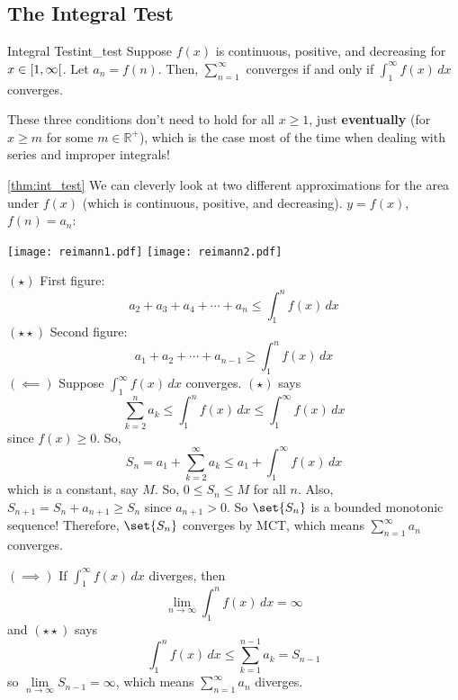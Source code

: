\subsection*{The Integral Test}
\begin{Theorem}{Integral Test}{int_test}
    Suppose $ f(x) $ is continuous, positive, and decreasing
    for $ x\in\interval[open right]{1}{\infty} $. Let $ a_n=f(n) $. Then,
    $ \sum\limits_{n=1}^{\infty}  $ converges if and only if $ \int_{1}^{\infty} f(x)\, d{x} $
    converges.
\end{Theorem}
\begin{Remark}{}{}
    These three conditions don't need to hold for all $ x\geqslant 1 $, just
    \textbf{eventually} (for $ x\geqslant m $ for some $ m\in\mathbb{R}^+ $),
    which is the case most of the time when dealing with series and improper integrals!
\end{Remark}
\begin{Proof}{\ref{thm:int_test}}{}
    We can cleverly look at two different approximations for the area
    under $ f(x) $ (which is continuous, positive, and decreasing).  $ y=f(x) $,
    $ f(n)=a_n $:
    \begin{center}
        \texttt{[image: reimann1.pdf]}
        \texttt{[image: reimann2.pdf]}
    \end{center}
    $ (\star) $ First figure:
    \[ a_2+a_3+a_4+\cdots+a_n\leqslant \int_{1}^{n} f(x)\, d{x} \]
    $ (\star\star) $ Second figure:
    \[ a_1+a_2+\cdots+a_{n-1}\geqslant \int_{1}^{n} f(x)\, d{x} \]
    $ (\impliedby) $ Suppose $ \int_{1}^{\infty} f(x)\, d{x} $ converges. $ (\star) $
    says
    \[ \sum\limits_{k=2}^{n} a_k\leqslant \int_{1}^{n} f(x)\, d{x}\leqslant
        \int_{1}^{\infty} f(x)\, d{x}  \]
    since $ f(x)\geqslant 0 $. So,
    \[ S_n=a_1+\sum\limits_{k=2}^{\infty} a_k\leqslant a_1+\int_{1}^{\infty} f(x)\, d{x}  \]
    which is a constant, say $ M $. So, $ 0\leqslant S_n\leqslant M $ for all $ n $.
    Also, $ S_{n+1}=S_{n}+a_{n+1}\geqslant S_n $ since $ a_{n+1}>0 $. So
    $ \set{S_n} $ is a bounded monotonic sequence! Therefore,
    $ \set{S_n} $ converges by MCT, which means $ \sum\limits_{n=1}^{\infty} a_n $
    converges.

    $ (\implies) $ If $ \int_{1}^{\infty} f(x)\, d{x}  $ diverges, then
    \[ \lim\limits_{{n} \to {\infty}} \int_{1}^{n} f(x)\, d{x} =\infty \]
    and $ (\star\star) $ says
    \[ \int_{1}^{n} f(x)\, d{x}\leqslant \sum\limits_{k=1}^{n-1} a_k=S_{n-1} \]
    so $ \lim\limits_{{n} \to {\infty}} S_{n-1}=\infty $, which means
    $ \sum\limits_{n=1}^{\infty} a_n $ diverges.
\end{Proof}

